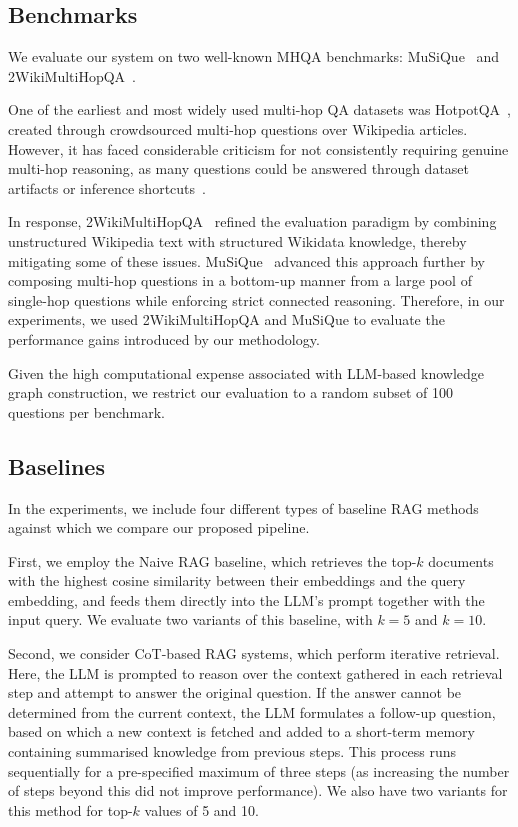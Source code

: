 \documentclass{article}
\begin{document}
\subsection{Benchmarks}
We evaluate our system on two well-known MHQA benchmarks: MuSiQue~\cite{musique} and 2WikiMultiHopQA~\cite{2wiki}.

One of the earliest and most widely used multi-hop QA datasets was HotpotQA~\cite{hp}, created through crowdsourced multi-hop questions over Wikipedia articles. However, it has faced considerable criticism for not consistently requiring genuine multi-hop reasoning, as many questions could be answered through dataset artifacts or inference shortcuts~\cite{hp_criticism1, hp_criticism2, hp_criticsm3}.

In response, 2WikiMultiHopQA~\cite{2wiki} refined the evaluation paradigm by combining unstructured Wikipedia text with structured Wikidata knowledge, thereby mitigating some of these issues. MuSiQue~\cite{musique} advanced this approach further by composing multi-hop questions in a bottom-up manner from a large pool of single-hop questions while enforcing strict connected reasoning. Therefore, in our experiments, we used 2WikiMultiHopQA and MuSiQue to evaluate the performance gains introduced by our methodology. 

Given the high computational expense associated with LLM-based knowledge graph construction, we restrict our evaluation to a random subset of 100 questions per benchmark.

\subsection{Baselines}
In the experiments, we include four different types of baseline RAG methods against which we compare our proposed pipeline.

First, we employ the Naive RAG baseline, which retrieves the top-$k$ documents with the highest cosine similarity between their embeddings and the query embedding, and feeds them directly into the LLM’s prompt together with the input query. We evaluate two variants of this baseline, with $k = 5$ and $k = 10$.

Second, we consider CoT-based RAG systems, which perform iterative retrieval. Here, the LLM is prompted to reason over the context gathered in each retrieval step and attempt to answer the original question. If the answer cannot be determined from the current context, the LLM formulates a follow-up question, based on which a new context is fetched and added to a short-term memory containing summarised knowledge from previous steps. This process runs sequentially for a pre-specified maximum of three steps (as increasing the number of steps beyond this did not improve performance). We also have two variants for this method for top-$k$ values of 5 and 10.
\end{document}
